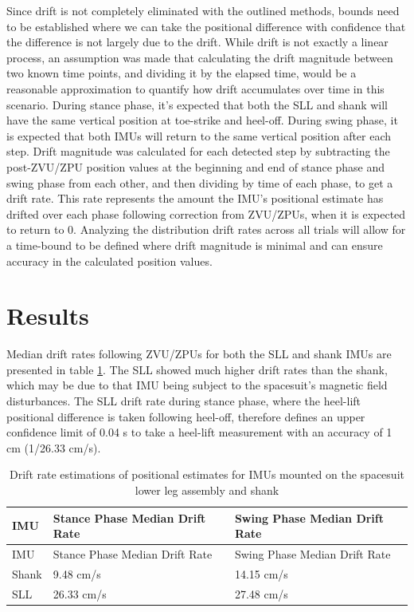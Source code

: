 \documentclass[defaultstyle,11pt]{comps}
\begin{document}
Since drift is not completely eliminated with the outlined methods, bounds need to be established where we can take the positional difference with confidence that the difference is not largely due to the drift.
While drift is not exactly a linear process, an assumption was made that calculating the drift magnitude between two known time points, and dividing it by the elapsed time, would be a reasonable approximation to quantify how drift accumulates over time in this scenario.
During stance phase, it's expected that both the SLL and shank will have the same vertical position at toe-strike and heel-off.
During swing phase, it is expected that both IMUs will return to the same vertical position after each step.
Drift magnitude was calculated for each detected step by subtracting the post-ZVU/ZPU position values at the beginning and end of stance phase and swing phase from each other, and then dividing by time of each phase, to get a drift rate.
This rate represents the amount the IMU's positional estimate has drifted over each phase following correction from ZVU/ZPUs, when it is expected to return to 0.
Analyzing the distribution drift rates across all trials will allow for a time-bound to be defined where drift magnitude is minimal and can ensure accuracy in the calculated position values.

\hypertarget{results}{%
\section{Results}\label{results}}

Median drift rates following ZVU/ZPUs for both the SLL and shank IMUs are presented in table \ref{tbl:SA1-drift}.
The SLL showed much higher drift rates than the shank, which may be due to that IMU being subject to the spacesuit's magnetic field disturbances.
The SLL drift rate during stance phase, where the heel-lift positional difference is taken following heel-off, therefore defines an upper confidence limit of 0.04 s to take a heel-lift measurement with an accuracy of 1 cm (1/26.33 cm/s).

\hypertarget{tbl:SA1-drift}{}
\begin{longtable}[]{@{}lll@{}}
\caption{\label{tbl:SA1-drift}Drift rate estimations of positional estimates for IMUs mounted on the spacesuit lower leg assembly and shank}\tabularnewline
\toprule
IMU & Stance Phase Median Drift Rate & Swing Phase Median Drift Rate\tabularnewline
\midrule
\endfirsthead
\toprule
IMU & Stance Phase Median Drift Rate & Swing Phase Median Drift Rate\tabularnewline
\midrule
\endhead
Shank & 9.48 cm/s & 14.15 cm/s\tabularnewline
SLL & 26.33 cm/s & 27.48 cm/s\tabularnewline
\bottomrule
\end{longtable}
\end{document}
